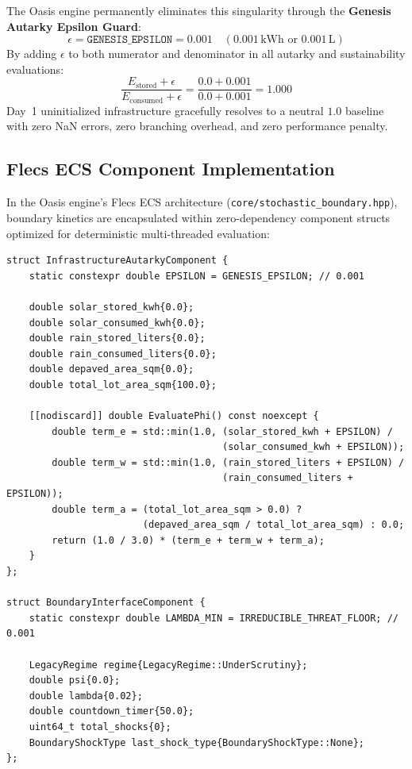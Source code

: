The Oasis engine permanently eliminates this singularity through the \textbf{Genesis Autarky Epsilon Guard}:
\begin{equation}
\epsilon = \texttt{GENESIS\_EPSILON} = 0.001 \quad (0.001\,\mathrm{kWh} \text{ or } 0.001\,\mathrm{L})
\label{eq:genesis_epsilon_def}
\end{equation}
By adding $\epsilon$ to both numerator and denominator in all autarky and sustainability evaluations:
\begin{equation}
\frac{E_{\mathrm{stored}} + \epsilon}{E_{\mathrm{consumed}} + \epsilon} = \frac{0.0 + 0.001}{0.0 + 0.001} = 1.000
\label{eq:epsilon_resolution}
\end{equation}
Day~1 uninitialized infrastructure gracefully resolves to a neutral $1.0$ baseline with zero NaN errors, zero branching overhead, and zero performance penalty.

\subsection{Flecs ECS Component Implementation}
In the Oasis engine's Flecs ECS architecture (\texttt{core/stochastic\_boundary.hpp}), boundary kinetics are encapsulated within zero-dependency component structs optimized for deterministic multi-threaded evaluation:
\begin{verbatim}
struct InfrastructureAutarkyComponent {
    static constexpr double EPSILON = GENESIS_EPSILON; // 0.001

    double solar_stored_kwh{0.0};
    double solar_consumed_kwh{0.0};
    double rain_stored_liters{0.0};
    double rain_consumed_liters{0.0};
    double depaved_area_sqm{0.0};
    double total_lot_area_sqm{100.0};

    [[nodiscard]] double EvaluatePhi() const noexcept {
        double term_e = std::min(1.0, (solar_stored_kwh + EPSILON) / 
                                      (solar_consumed_kwh + EPSILON));
        double term_w = std::min(1.0, (rain_stored_liters + EPSILON) / 
                                      (rain_consumed_liters + EPSILON));
        double term_a = (total_lot_area_sqm > 0.0) ? 
                        (depaved_area_sqm / total_lot_area_sqm) : 0.0;
        return (1.0 / 3.0) * (term_e + term_w + term_a);
    }
};

struct BoundaryInterfaceComponent {
    static constexpr double LAMBDA_MIN = IRREDUCIBLE_THREAT_FLOOR; // 0.001

    LegacyRegime regime{LegacyRegime::UnderScrutiny};
    double psi{0.0};
    double lambda{0.02};
    double countdown_timer{50.0};
    uint64_t total_shocks{0};
    BoundaryShockType last_shock_type{BoundaryShockType::None};
};
\end{verbatim}

